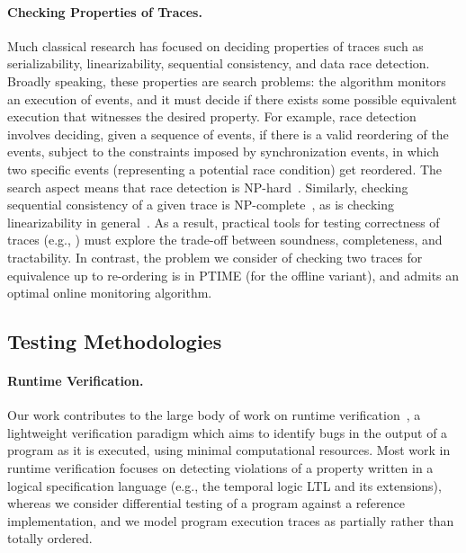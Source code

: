 \paragraph{Checking Properties of Traces.}
Much classical research has focused on deciding properties of traces such as serializability, linearizability, sequential consistency, and data race detection.
Broadly speaking, these properties are search problems: the algorithm monitors an execution of events, and it must decide if there exists some possible equivalent execution that witnesses the desired property. For example, race detection involves deciding, given a sequence of events, if there is a valid reordering of the events, subject to the constraints imposed by synchronization events, in which two specific events (representing a potential race condition) get reordered. The search aspect means that race detection is NP-hard~\cite{netzer1990complexity,netzer1992race}.
Similarly, checking sequential consistency of a given trace is NP-complete~\cite{gibbons1992complexity},
as is checking linearizability in general~\cite{gibbons1997testing}.
As a result, practical tools for testing correctness of traces (e.g., \cite{savage1997eraser,park2011efficient,sen2008race,wing1993testing,burckhardt2010line,lowe2017testing}) must explore the trade-off between soundness, completeness, and tractability.
In contrast, the problem we consider of checking two traces for equivalence up to re-ordering is in PTIME (for the offline variant), and admits an optimal online monitoring algorithm.

\subsection{Testing Methodologies}

\paragraph{Runtime Verification.}
Our work contributes to the large body of work on
runtime verification~\cite{leucker2009brief,havelund2004efficient}, a
lightweight verification paradigm which aims to identify bugs in the
output of a program as it is executed, using minimal computational
resources.  Most work in runtime verification focuses on detecting
violations of a property written in a logical specification language
(e.g., the temporal logic LTL and its extensions), whereas we consider
differential testing of a program against a reference implementation,
and we model program execution traces as partially rather than totally
ordered.

